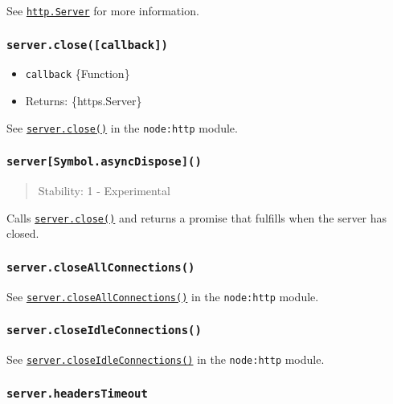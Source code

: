 See \href{http.md\#class-httpserver}{\texttt{http.Server}} for more
information.

\subsubsection{\texorpdfstring{\texttt{server.close({[}callback{]})}}{server.close({[}callback{]})}}\label{server.closecallback}

\begin{itemize}
\tightlist
\item
  \texttt{callback} \{Function\}
\item
  Returns: \{https.Server\}
\end{itemize}

See \href{http.md\#serverclosecallback}{\texttt{server.close()}} in the
\texttt{node:http} module.

\subsubsection{\texorpdfstring{\texttt{server{[}Symbol.asyncDispose{]}()}}{server{[}Symbol.asyncDispose{]}()}}\label{serversymbol.asyncdispose}

\begin{quote}
Stability: 1 - Experimental
\end{quote}

Calls \hyperref[serverclosecallback]{\texttt{server.close()}} and
returns a promise that fulfills when the server has closed.

\subsubsection{\texorpdfstring{\texttt{server.closeAllConnections()}}{server.closeAllConnections()}}\label{server.closeallconnections}

See
\href{http.md\#servercloseallconnections}{\texttt{server.closeAllConnections()}}
in the \texttt{node:http} module.

\subsubsection{\texorpdfstring{\texttt{server.closeIdleConnections()}}{server.closeIdleConnections()}}\label{server.closeidleconnections}

See
\href{http.md\#servercloseidleconnections}{\texttt{server.closeIdleConnections()}}
in the \texttt{node:http} module.

\subsubsection{\texorpdfstring{\texttt{server.headersTimeout}}{server.headersTimeout}}\label{server.headerstimeout}

